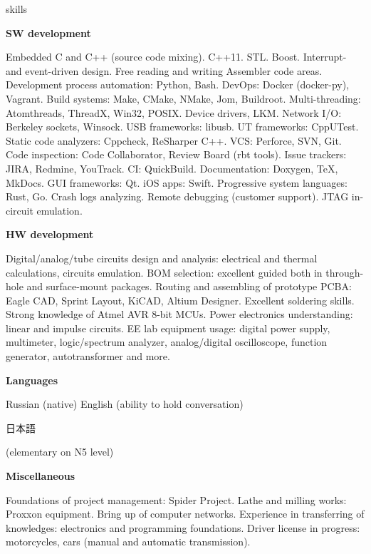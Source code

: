 \documentclass{template}
\begin{document}
\begin{rSection}{skills}
\begin{rItemize}

\item \textbf{SW development}

      Embedded C and C++ (source code mixing). C++11. STL. Boost. Interrupt- and event-driven design. Free reading and writing Assembler code
      areas. Development process automation: Python, Bash. DevOps: Docker (docker-py), Vagrant. Build systems: Make, CMake, NMake, Jom, Buildroot.
      Multi-threading: Atomthreads, ThreadX, Win32, POSIX. Device drivers, LKM. Network I/O: Berkeley sockets, Winsock. USB frameworks: libusb. UT
      frameworks: CppUTest. Static code analyzers: Cppcheck, ReSharper C++. VCS: Perforce, SVN, Git. Code inspection: Code Collaborator, Review
      Board (rbt tools). Issue trackers: JIRA, Redmine, YouTrack. CI: QuickBuild. Documentation: Doxygen, \TeX, MkDocs. GUI frameworks: Qt. iOS
      apps: Swift. Progressive system languages: Rust, Go. Crash logs analyzing. Remote debugging (customer support). JTAG in-circuit emulation.

\item \textbf{HW development}

      Digital/analog/tube circuits design and analysis: electrical and thermal calculations, circuits emulation. BOM selection: excellent guided
      both in through-hole and surface-mount packages. Routing and assembling of prototype PCBA: Eagle CAD, Sprint Layout, KiCAD,
      Altium Designer. Excellent soldering skills. Strong knowledge of Atmel AVR 8-bit MCUs. Power electronics understanding: linear and
      impulse circuits. EE lab equipment usage: digital power supply, multimeter, logic/spectrum analyzer, analog/digital oscilloscope, function
      generator, autotransformer and more.

\item \textbf{Languages}

      Russian (native) \newline
      English (ability to hold conversation) \newline
      \begin{CJK}{UTF8}{min}日本語\end{CJK} (elementary on N5 level)

\item \textbf{Miscellaneous}

      Foundations of project management: Spider Project. Lathe and milling works: Proxxon equipment. Bring up of computer networks. Experience in
      transferring of knowledges: electronics and programming foundations. Driver license in progress: motorcycles, cars (manual and automatic
      transmission).

\end{rItemize}
\end{rSection}
\end{document}
